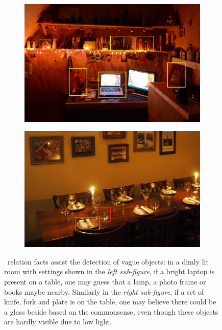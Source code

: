 \begin{figure}[b]
	\centering
	\begin{subfigure}{.45\textwidth}
		\centering
		\includegraphics[width=0.95\columnwidth]{dim-room.jpg}
	\end{subfigure}
	\begin{subfigure}{.45\textwidth}
		\centering
		\includegraphics[width=0.95\columnwidth]{dim-table.jpg}
	\end{subfigure}
	\caption{\lnear~relation facts assist the detection of vague objects: in a dimly lit room with settings shown in the \textit{left sub-figure}, if a bright laptop is present on a table, one may guess that a lamp, a photo frame or books maybe nearby. Similarly in the \textit{right sub-figure}, if a set of knife, fork and plate is on the table, one may believe there could be a glass beside based on the commonsense, 
		even though these objects are hardly visible due to low light.}
	\label{fig:dim}
\end{figure}
